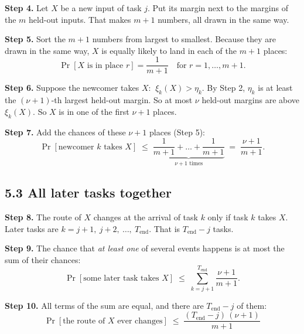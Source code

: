 \documentclass[11pt,a4paper]{article}
\newcommand{\step}[1]{\textbf{Step #1.}}
\begin{document}
\step{4} Let $X$ be a new input of task $j$. Put its margin next to the margins of the $m$ held-out
inputs. That makes $m+1$ numbers, all drawn in the same way.

\step{5} Sort the $m+1$ numbers from largest to smallest. Because they are drawn in the same way,
$X$ is equally likely to land in each of the $m+1$ places:
\[ \Pr[X \text{ is in place } r] = \frac{1}{m+1} \quad \text{for } r = 1,\dots,m+1 . \]

\step{6} Suppose the newcomer takes $X$: $\ \xi_k(X) > \eta_k$. By Step 2, $\eta_k$ is at least the
$(\nu+1)$-th largest held-out margin. So at most $\nu$ held-out margins are above $\xi_k(X)$. So $X$ is
in one of the first $\nu+1$ places.

\begin{center}
\end{center}

\step{7} Add the chances of these $\nu+1$ places (Step 5):
\[ \Pr[\text{newcomer } k \text{ takes } X] \;\le\; \underbrace{\frac{1}{m+1} + \dots + \frac{1}{m+1}}_{\nu+1 \text{ times}} \;=\; \frac{\nu+1}{m+1}. \]

\subsection*{5.3 All later tasks together}

\step{8} The route of $X$ changes at the arrival of task $k$ only if task $k$ takes $X$. Later tasks
are $k = j+1,\ j+2,\ \dots,\ T_{\text{end}}$. That is $T_{\text{end}} - j$ tasks.

\step{9} The chance that \emph{at least one} of several events happens is at most the sum of their
chances:
\[ \Pr[\text{some later task takes } X] \;\le\; \sum_{k=j+1}^{T_{\text{end}}} \frac{\nu+1}{m+1} . \]

\step{10} All terms of the sum are equal, and there are $T_{\text{end}}-j$ of them:
\[ \boxed{\ \Pr[\text{the route of } X \text{ ever changes}] \;\le\; \frac{(T_{\text{end}}-j)\,(\nu+1)}{m+1}\ } \]
\end{document}
